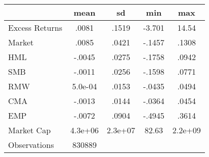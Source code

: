 {
\def\sym#1{\ifmmode^{#1}\else\(^{#1}\)\fi}
\begin{tabular}{l*{1}{cccc}}
\hline\hline
                    &        mean&          sd&         min&         max\\
\hline
Excess Returns      &       .0081&       .1519&      -3.701&       14.54\\
Market              &       .0085&       .0421&      -.1457&       .1308\\
HML                 &      -.0045&       .0275&      -.1758&       .0942\\
SMB                 &      -.0011&       .0256&      -.1598&       .0771\\
RMW                 &     5.0e-04&       .0153&      -.0435&       .0494\\
CMA                 &      -.0013&       .0144&      -.0364&       .0454\\
EMP                 &      -.0072&       .0904&      -.4945&       .3614\\
Market Cap          &     4.3e+06&     2.3e+07&       82.63&     2.2e+09\\
\hline
Observations        &      830889&            &            &            \\
\hline\hline
\end{tabular}
}
